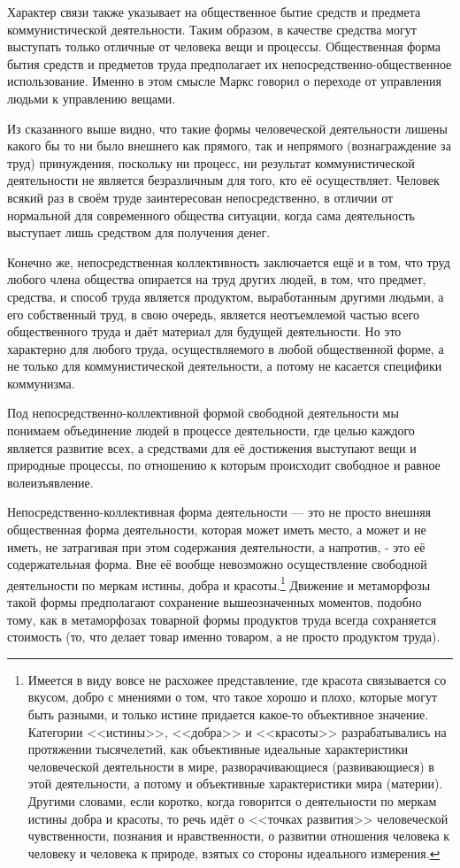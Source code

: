\documentclass[12pt,a4paper,openany]{book}
\begin{document}
Характер связи также указывает на общественное бытие средств и предмета коммунистической деятельности. Таким образом, в качестве средства могут выступать только отличные от человека вещи и процессы. Общественная форма бытия средств и предметов труда предполагает их непосредственно-общественное использование. Именно в этом смысле Маркс говорил о переходе от управления людьми к управлению вещами.

Из сказанного выше видно, что такие формы человеческой деятельности лишены какого бы то ни было внешнего как прямого, так и непрямого (вознаграждение за труд) принуждения, поскольку ни процесс, ни результат коммунистической деятельности не является безразличным для того, кто её осуществляет. Человек всякий раз в своём труде заинтересован непосредственно, в отличии от нормальной для современного общества ситуации, когда сама деятельность выступает лишь средством для получения денег.

Конечно же, непосредственная коллективность заключается ещё и в том, что труд любого члена общества опирается на труд других людей, в том, что предмет, средства, и способ труда является продуктом, выработанным другими людьми, а его собственный труд, в свою очередь, является неотъемлемой частью всего общественного труда и даёт материал для будущей деятельности. Но это характерно для любого труда, осуществляемого в любой общественной форме, а не только для коммунистической деятельности, а потому не касается специфики коммунизма.

Под непосредственно-коллективной формой свободной деятельности мы понимаем объединение людей в процессе деятельности, где целью каждого является развитие всех, а средствами для её достижения выступают вещи и природные процессы, по отношению к которым происходит свободное и равное волеизъявление.

Непосредственно-коллективная форма деятельности — это не просто внешняя общественная форма деятельности, которая может иметь место, а может и не иметь, не затрагивая при этом содержания деятельности, а напротив, - это её содержательная форма. Вне её вообще невозможно осуществление свободной деятельности по меркам истины, добра и красоты.\footnote{Имеется в виду вовсе не расхожее представление, где красота связывается со вкусом, добро с мнениями о том, что такое хорошо и плохо, которые могут быть разными, и только истине придается какое-то объективное значение. Категории <<истины>>, <<добра>> и <<красоты>> разрабатывались на протяжении тысячелетий, как объективные идеальные характеристики человеческой деятельности в мире, разворачивающиеся (развивающиеся) в этой деятельности, а потому и объективные характеристики мира (материи). Другими словами, если коротко, когда говорится о деятельности по меркам истины добра и красоты, то речь идёт о <<точках развития>> человеческой чувственности, познания и нравственности, о развитии отношения человека к человеку и человека к природе, взятых со стороны идеального измерения.} Движение и метаморфозы такой формы предполагают сохранение вышеозначенных моментов, подобно тому, как в метаморфозах товарной формы продуктов труда всегда сохраняется стоимость (то, что делает товар именно товаром, а не просто продуктом труда).
\end{document}
